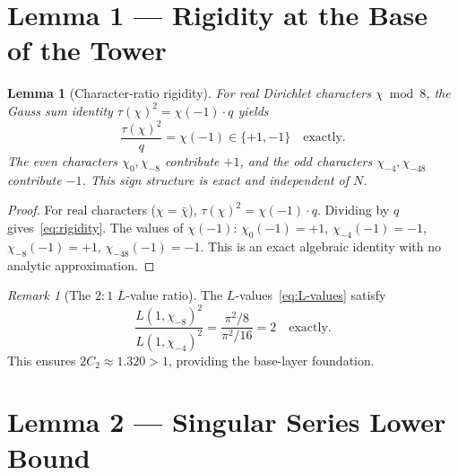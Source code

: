 \documentclass[11pt,a4paper]{article}
\newtheorem{lemma}[theorem]{Lemma}
\theoremstyle{remark}
\newtheorem{remark}[theorem]{Remark}
\begin{document}
\section{Lemma 1 --- Rigidity at the Base of the Tower}
\label{sec:rigidity}

\begin{lemma}[Character-ratio rigidity]
\label{lem:rigidity}
For real Dirichlet characters $\chi \bmod 8$, the Gauss sum identity
$\tau(\chi)^2 = \chi(-1)\cdot q$ yields
\begin{equation}
\label{eq:rigidity}
  \frac{\tau(\chi)^2}{q} = \chi(-1) \in \{+1, -1\} \quad \text{exactly}.
\end{equation}
The even characters $\chi_0, \chi_{-8}$ contribute $+1$, and the odd
characters $\chi_{-4}, \chi_{-48}$ contribute $-1$.  This sign structure
is exact and independent of $N$.
\end{lemma}

\begin{proof}
For real characters ($\chi = \bar{\chi}$), $\tau(\chi)^2 = \chi(-1)\cdot q$.
Dividing by $q$ gives~\eqref{eq:rigidity}.  The values of $\chi(-1)$:
$\chi_0(-1) = +1$, $\chi_{-4}(-1) = -1$, $\chi_{-8}(-1) = +1$,
$\chi_{-48}(-1) = -1$.
This is an exact algebraic identity with no analytic approximation.
\end{proof}

\begin{remark}[The $2\!:\!1$ $L$-value ratio]
\label{rem:2to1}
The $L$-values~\eqref{eq:L-values} satisfy
\begin{equation}
\label{eq:miracle}
  \frac{L(1,\chi_{-8})^2}{L(1,\chi_{-4})^2}
  = \frac{\pi^2/8}{\pi^2/16} = 2 \quad \text{exactly}.
\end{equation}
This ensures $2C_2 \approx 1.320 > 1$, providing the base-layer
foundation.
\end{remark}

\section{Lemma 2 --- Singular Series Lower Bound}
\label{sec:sing-series-lb}
\end{document}
